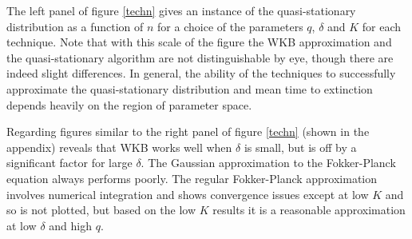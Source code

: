 The left panel of figure \ref{techn} gives an instance of the quasi-stationary distribution as a function of $n$ for a choice of the parameters $q$, $\delta$ and $K$ for each technique. 
Note that with this scale of the figure the WKB approximation and the quasi-stationary algorithm are not distinguishable by eye, though there are indeed slight differences. 
In general, the ability of the techniques to successfully approximate the quasi-stationary distribution and mean time to extinction depends heavily on the region of parameter space. 
\iffalse
What I observe is that for large $K$ the celebrated FP approximation is valid in all cases except for low $\delta$ and $q$. 
For small $K$ it is a poor approximation except low $\delta$ and high $q$. %
The WKB method fares better, appearing to be reasonable everywhere in $q$, $\delta$, $K$ parameter space. 
All other approximations match near the fixed point but fail elsewhere. 
\fi
Regarding figures similar to the right panel of figure \ref{techn} (shown in the appendix) reveals that WKB works well when $\delta$ is small, but is off by a significant factor for large $\delta$. 
The Gaussian approximation to the Fokker-Planck equation always performs poorly. 
The regular Fokker-Planck approximation involves numerical integration and shows convergence issues except at low $K$ and so is not plotted, but based on the low $K$ results it is a reasonable approximation at low $\delta$ and high $q$. 
%
